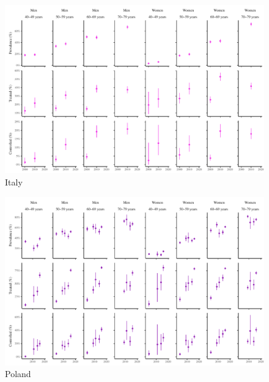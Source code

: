 \documentclass[12pt]{article}
\begin{document}
\begin{appendix}
\begin{refsection}
\begin{landscape}
        \begin{figure}[H]
            \centering
            \includegraphics[width=\linewidth]{../3_figures/countries/fig_italy.pdf}
            \caption{Italy}
            \label{fig:italy}
        \end{figure}

        \begin{figure}[H]
            \centering
            \includegraphics[width=\linewidth]{../3_figures/countries/fig_poland.pdf}
            \caption{Poland}
            \label{fig:poland}
        \end{figure}


\end{landscape}
\end{refsection}
\end{appendix}
\end{document}
